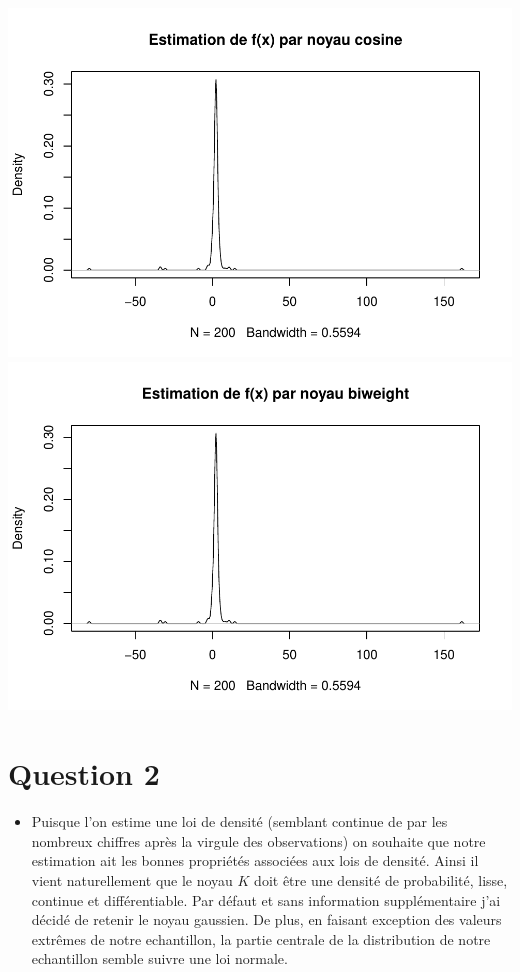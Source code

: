 \documentclass[
]{article}
\providecommand{\tightlist}{%
  \setlength{\itemsep}{0pt}\setlength{\parskip}{0pt}}
\begin{document}
\includegraphics{DM_files/figure-latex/unnamed-chunk-2-6.pdf}
\includegraphics{DM_files/figure-latex/unnamed-chunk-2-7.pdf}

\hypertarget{question-2}{%
\section{Question 2}\label{question-2}}

\begin{itemize}
\tightlist
\item
  Puisque l'on estime une loi de densité (semblant continue de par les
  nombreux chiffres après la virgule des observations) on souhaite que
  notre estimation ait les bonnes propriétés associées aux lois de
  densité. Ainsi il vient naturellement que le noyau \(K\) doit être une
  densité de probabilité, lisse, continue et différentiable. Par défaut
  et sans information supplémentaire j'ai décidé de retenir le noyau
  gaussien. De plus, en faisant exception des valeurs extrêmes de notre
  echantillon, la partie centrale de la distribution de notre
  echantillon semble suivre une loi normale.
\end{itemize}
\end{document}
